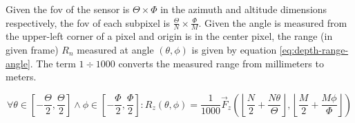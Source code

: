 Given the \gls{fov} of the sensor is $\Theta \times \Phi$ in the azimuth and altitude dimensions respectively,
the \gls{fov} of each subpixel is $\frac{\Theta}{N} \times \frac{\Phi}{M}$.
Given the angle is measured from the upper-left corner of a pixel and origin is in the center pixel,
the range (in given frame) $R_n$ measured at angle $(\theta, \phi)$ 
is given by equation \ref{eq:depth-range-angle}.
The term $1 \div 1000$ converts the measured range from millimeters to meters.

\begin{equation}
    \label{eq:depth-range-angle}
    \forall \theta \in \left[ -\frac{\Theta}{2}, \frac{\Theta}{2} \right] \land \phi \in \left[ -\frac{\Phi}{2}, \frac{\Phi}{2} \right] :
    R_z(\theta, \phi) =
    \frac{1}{1000} 
    \vec{F}_z \left(
        \left\lfloor \frac{N}{2} + \frac{N\theta}{\Theta} \right\rfloor ,
        \left\lfloor \frac{M}{2} + \frac{M\phi}{\Phi} \right\rfloor
    \right)
\end{equation}

